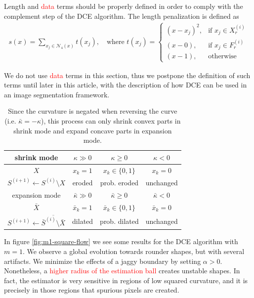 \documentclass[smallextended]{svjour3}       %
\newcommand{\revision}[1]{\textcolor{red}{#1}}
\begin{document}
Length and \revision{data} terms should be properly defined in order to comply with the complement step of the DCE
algorithm. The length penalization is defined as
\begin{align}
  s(x)=\sum_{x_j \in \mathcal{N}_4(x)}{ t(x_j) }, \quad \text{where } t(x_j) = \left\{\begin{array}{ll}
  (x-x_j)^2, & \text{if } x_j \in X_{r}^{(i)}\\
  (x-0), & \text{if } x_j \in F_{r}^{(i)}\\
  (x-1), & \text{otherwise }
  \end{array}\right.
  \label{eq:length-penalization}
\end{align}
	
We do not use \revision{data} terms in this section, thus we postpone the definition of such terms until later in this
article, with the description of how DCE can be used in an image segmentation framework.



\begin{table}
  \center
  \setlength{\extrarowheight}{0.5em}
  \begin{tabular}{|c|c|c|c|} \hline
    shrink mode &    $\kappa \gg 0$ & $\kappa \geq 0$ &  $\kappa < 0$ \\ \hline
    $X$ & $x_k=1$ & $x_k \in \{0,1\}$ & $x_k=0$ \\ \hline
    $S^{(i+1)} \leftarrow S^{(i)} \setminus X$ & eroded & prob. eroded & unchanged  \\ \hline \hline
    expansion mode &    $\bar{\kappa} \gg 0$ & $\bar{\kappa} \geq 0$ & $\bar{\kappa} < 0$ \\ \hline
    $\bar{X}$ & $\bar{x}_k=1$ & $\bar{x}_k \in \{0,1\}$ & $\bar{x}_k=0$ \\ \hline
    $S^{(i+1)} \leftarrow \overline{\bar{S}^{(i)} \setminus \bar{X}}$ & dilated & prob. dilated & unchanged \\ \hline 
  \end{tabular}
  
  \caption{  Since the curvature is negated when reversing the curve (i.e. $\bar{\kappa}=-\kappa$), this process can only shrink  convex parts in shrink mode and expand concave parts in expansion mode.}
   \label{tab:flow-summary}	  

\end{table}


In figure \ref{fig:m1-square-flow} we see some results for the DCE algorithm with $m=1$. We observe a global evolution
towards rounder shapes, but with several artifacts. We minimize the effects of a jaggy boundary by setting $\alpha >
0$. Nonetheless, a \revision{higher radius of the estimation ball} creates unstable shapes. In fact, the estimator is very sensitive in
regions of low squared curvature, and it is precisely in those regions that spurious pixels are created.
\end{document}
